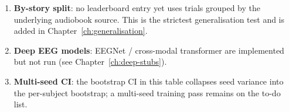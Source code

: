 \begin{enumerate}
  \item \textbf{By-story split}: no leaderboard entry yet uses trials
        grouped by the underlying audiobook source. This is the
        strictest generalisation test and is added in
        Chapter~\ref{ch:generalisation}.
  \item \textbf{Deep EEG models}: EEGNet / cross-modal transformer are
        implemented but not run (see Chapter~\ref{ch:deep-stubs}).
  \item \textbf{Multi-seed CI}: the bootstrap CI in this table collapses
        seed variance into the per-subject bootstrap; a multi-seed
        training pass remains on the to-do list.
\end{enumerate}
